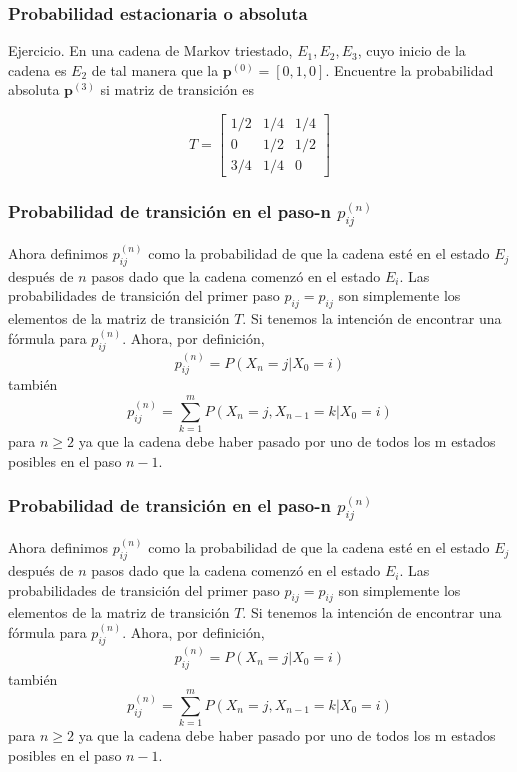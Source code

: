 \documentclass[spanish]{beamer}
\begin{document}
\begin{frame}
\frametitle{Probabilidad estacionaria o absoluta}
Ejercicio. En una cadena de Markov triestado, $E_{1} ,E_{2} ,E_{3}$, cuyo inicio de la cadena es $E_{2}$ de tal manera que la $\textbf{p}^{(0)}= \left[ 0, 1, 0 \right]  $. Encuentre la probabilidad absoluta $\textbf{p}^{(3)}$ si matriz de transición es 

\begin{equation}
T =\begin{bmatrix}
1/2 & 1/4 & 1/4 \\
0 & 1/2 & 1/2  \\
3/4 & 1/4 & 0 
\end{bmatrix}
\end{equation} 
 
\end{frame}


\begin{frame}
\frametitle{Probabilidad de transición en el paso-n $p_{ij}^{(n)}$}
Ahora definimos $p_{ij}^{(n)}$ como la probabilidad de que la cadena esté en el estado $E_{j}$ después de $n$ pasos dado que la cadena comenzó en el estado $E_{i}$. Las probabilidades de transición del primer paso $p_{ij} = p_{ij}$ son simplemente los elementos de la matriz de transición $T$. Si tenemos la intención de encontrar una fórmula para $p^{(n)}_{ij}$. Ahora, por definición,
 \begin{equation*}
 p_{ij}^{(n)}=P(X_{n}=j \vert X_{0}=i)
 \end{equation*}
 también 
  \begin{equation*}
 p_{ij}^{(n)}=\sum_{k=1}^{m} P(X_{n}=j, X_{n-1}=k \vert X_{0}=i)
 \end{equation*}
 para $n \geq 2$ ya que la cadena debe haber pasado por uno de todos los m estados posibles en el paso $n-1$.
\end{frame}

\begin{frame}
\frametitle{Probabilidad de transición en el paso-n $p_{ij}^{(n)}$}
Ahora definimos $p_{ij}^{(n)}$ como la probabilidad de que la cadena esté en el estado $E_{j}$ después de $n$ pasos dado que la cadena comenzó en el estado $E_{i}$. Las probabilidades de transición del primer paso $p_{ij} = p_{ij}$ son simplemente los elementos de la matriz de transición $T$. Si tenemos la intención de encontrar una fórmula para $p^{(n)}_{ij}$. Ahora, por definición,
 \begin{equation*}
 p_{ij}^{(n)}=P(X_{n}=j \vert X_{0}=i)
 \end{equation*}
 también 
  \begin{equation*}
 p_{ij}^{(n)}=\sum_{k=1}^{m} P(X_{n}=j, X_{n-1}=k \vert X_{0}=i)
 \end{equation*}
 para $n \geq 2$ ya que la cadena debe haber pasado por uno de todos los m estados posibles en el paso $n-1$.
\end{frame}
\end{document}

